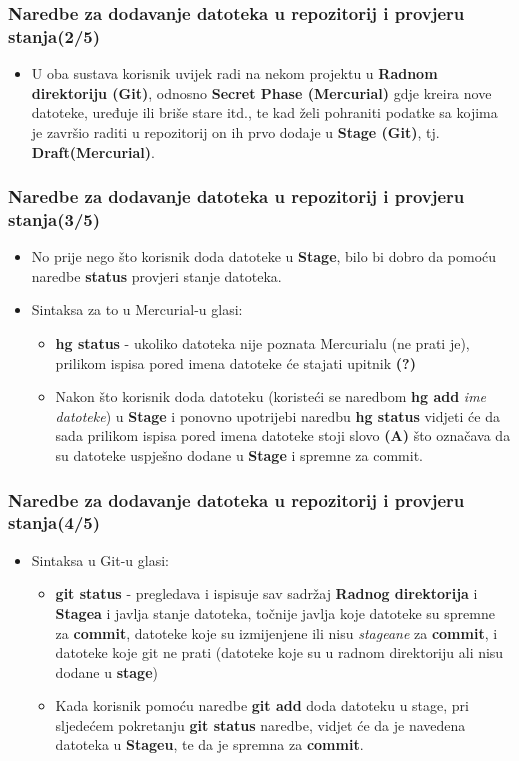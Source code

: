 \documentclass{beamer}
\begin{document}
	\begin{frame}
		\frametitle{Naredbe za dodavanje datoteka u repozitorij i provjeru stanja(2/5)}
		 \begin{itemize}
			
			\item U oba sustava korisnik uvijek radi na nekom projektu u \textbf{Radnom direktoriju (Git)}, odnosno \textbf{Secret Phase (Mercurial)} gdje kreira nove datoteke, uređuje ili briše stare itd., te kad želi pohraniti podatke sa kojima je završio raditi u repozitorij on ih prvo dodaje u \textbf{Stage (Git)}, tj. \textbf{Draft(Mercurial)}.
		  \end{itemize}
	\end{frame}

	\begin{frame}
		\frametitle{Naredbe za dodavanje datoteka u repozitorij i provjeru stanja(3/5)}
 		\begin{itemize}
  		  	\item No prije nego što korisnik doda datoteke u \textbf{Stage}, bilo bi dobro da pomoću naredbe \textbf{status} provjeri stanje datoteka.
			\item Sintaksa za to u Mercurial-u glasi:
			\begin{itemize}
				\item \textbf{hg status} - ukoliko datoteka nije poznata Mercurialu (ne prati je), prilikom ispisa pored imena datoteke će stajati upitnik \textbf{(?)}
				\item Nakon što korisnik doda datoteku (koristeći se naredbom \textbf{hg add} \textit{ime datoteke}) u \textbf{Stage} i ponovno upotrijebi naredbu \textbf{hg status} vidjeti će da sada prilikom ispisa pored imena datoteke stoji slovo \textbf{(A)} što označava da su datoteke uspješno dodane u \textbf{Stage} i spremne za commit.
			\end{itemize}
		\end{itemize}
	\end{frame}

	\begin{frame}
		\frametitle{Naredbe za dodavanje datoteka u repozitorij i provjeru stanja(4/5)}
 		\begin{itemize}
  		  	\item Sintaksa u Git-u glasi:
			\begin{itemize}
				  \item \textbf{git status} - pregledava i ispisuje sav sadržaj \textbf{Radnog direktorija} i \textbf{Stagea} i javlja stanje datoteka, točnije javlja koje datoteke su spremne za \textbf{commit}, datoteke koje su izmijenjene ili nisu \textit{stageane} za \textbf{commit}, i datoteke koje git ne prati (datoteke koje su u radnom direktoriju ali nisu dodane u \textbf{stage})
				  \item Kada korisnik pomoću naredbe \textbf{git add} doda datoteku u stage, pri sljedećem pokretanju \textbf{git status} naredbe, vidjet će da je navedena datoteka u \textbf{Stageu}, te da je spremna za \textbf{commit}.
		  	\end{itemize}
		\end{itemize}
	\end{frame}
\end{document}
